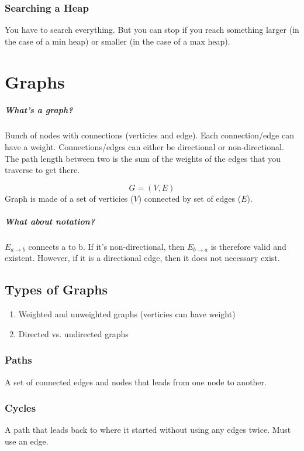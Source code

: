 \documentclass[a4paper,12pt]{report}
\begin{document}
\subsection{Searching a Heap}
You have to search everything. But you can stop if you reach something larger (in the case of a min heap) or smaller (in the case of a max heap). 

\chapter{Graphs}
\paragraph{What's a graph? } Bunch of nodes with connections (verticies and edge). Each connection/edge can have a weight. Connections/edges can either be directional or non-directional. The path length between two is the sum of the weights of the edges that you traverse to get there. 

$$G = (V, E)$$
Graph is made of a set of verticies ($V$) connected by set of edges ($E$).

\paragraph{What about notation? } $E_{a \to b}$ connects a to b. If it's non-directional, then $E_{b \to a}$ is therefore valid and existent. However, if it is a directional edge, then it does not necessary exist.

\section{Types of Graphs}
\begin{enumerate}
\item Weighted and unweighted graphs (verticies can have weight)
\item Directed vs. undirected graphs
\end{enumerate}

\subsection{Paths}
A set of connected edges and nodes that leads from one node to another.

\subsection{Cycles}
A path that leads back to where it started without using any edges twice. Must use an edge.
\end{document}
